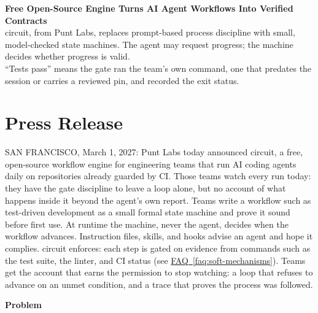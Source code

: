 \documentclass[11pt,letterpaper]{article}
\newcommand{\prsection}[1]{%
  \vspace{1em}%
  {\large\bfseries\color{SectionBlue}#1}%
  \vspace{0.3em}\par%
}
\newcommand{\faqref}[1]{\hyperref[#1]{FAQ~\ref*{#1}}}
\begin{document}
\begin{center}
  {\LARGE\bfseries\color{SectionBlue} Free Open-Source Engine Turns AI Agent Workflows Into Verified Contracts} \\[0.8em]
  {\large\color{AccentGray} circuit, from Punt Labs, replaces prompt-based process discipline with small, model-checked state machines. The agent may request progress; the machine decides whether progress is valid.} \\[0.3em]
  {\large\color{AccentGray} ``Tests pass'' means the gate ran the team's own command, one that predates the session or carries a reviewed pin, and recorded the exit status.}
\end{center}

\vspace{0.5em}


\section*{Press Release}

SAN FRANCISCO, March 1, 2027: Punt Labs today announced circuit, a free, open-source workflow engine for engineering teams that run AI coding agents daily on repositories already guarded by CI. Those teams watch every run today: they have the gate discipline to leave a loop alone, but no account of what happens inside it beyond the agent's own report. Teams write a workflow such as test-driven development as a small formal state machine and prove it sound before first use. At runtime the machine, never the agent, decides when the workflow advances. Instruction files, skills, and hooks advise an agent and hope it complies. circuit enforces: each step is gated on evidence from commands such as the test suite, the linter, and CI status (see \faqref{faq:soft-mechanisms}). Teams get the account that earns the permission to stop watching: a loop that refuses to advance on an unmet condition, and a trace that proves the process was followed.

\prsection{Problem}
\end{document}
